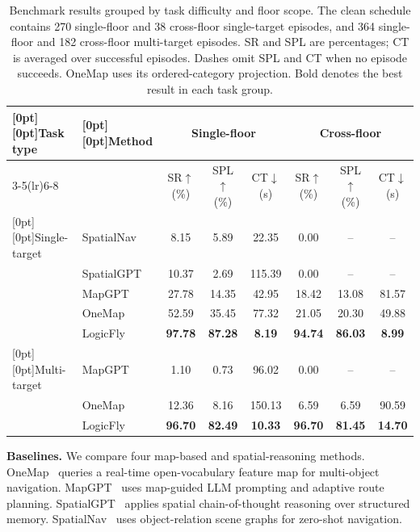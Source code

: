 \documentclass[letterpaper,10pt,journal]{IEEEtran}
\begin{document}
\begin{table}[!t]
\caption{Benchmark results grouped by task difficulty and floor scope. The clean schedule contains 270 single-floor and 38 cross-floor single-target episodes, and 364 single-floor and 182 cross-floor multi-target episodes. SR and SPL are percentages; CT is averaged over successful episodes. Dashes omit SPL and CT when no episode succeeds. OneMap uses its ordered-category projection. Bold denotes the best result in each task group.}
\label{tab:main}\centering\small\renewcommand{\arraystretch}{1.15}
\begin{tabular*}{0.94\textwidth}{@{\extracolsep{\fill}}llcccccc@{}}\toprule
\raisebox{-8pt}[0pt][0pt]{Task type}&\raisebox{-8pt}[0pt][0pt]{Method}&\multicolumn{3}{c}{Single-floor}&\multicolumn{3}{c}{Cross-floor}\\
\cmidrule(lr){3-5}\cmidrule(lr){6-8}
&&SR$\uparrow$ (\%)&SPL$\uparrow$ (\%)&CT$\downarrow$ (s)&SR$\uparrow$ (\%)&SPL$\uparrow$ (\%)&CT$\downarrow$ (s)\\\midrule
\raisebox{-22.9pt}[0pt][0pt]{Single-target}&SpatialNav&8.15&5.89&22.35&0.00&\multicolumn{1}{c}{--}&\multicolumn{1}{c}{--}\\
&SpatialGPT&10.37&2.69&115.39&0.00&\multicolumn{1}{c}{--}&\multicolumn{1}{c}{--}\\
&MapGPT&27.78&14.35&42.95&18.42&13.08&81.57\\
&OneMap&52.59&35.45&77.32&21.05&20.30&49.88\\
&LogicFly&\textbf{97.78}&\textbf{87.28}&\textbf{8.19}&\textbf{94.74}&\textbf{86.03}&\textbf{8.99}\\\midrule
\raisebox{-11.45pt}[0pt][0pt]{Multi-target}&MapGPT&1.10&0.73&96.02&0.00&\multicolumn{1}{c}{--}&\multicolumn{1}{c}{--}\\
&OneMap&12.36&8.16&150.13&6.59&6.59&90.59\\
&LogicFly&\textbf{96.70}&\textbf{82.49}&\textbf{10.33}&\textbf{96.70}&\textbf{81.45}&\textbf{14.70}\\\bottomrule
\end{tabular*}
\end{table}

\textbf{Baselines.}
We compare four map-based and spatial-reasoning methods. OneMap~\cite{busch2025onemap} queries a real-time open-vocabulary feature map for multi-object navigation. MapGPT~\cite{chen2024mapgpt} uses map-guided LLM prompting and adaptive route planning. SpatialGPT~\cite{jiang2025spatialgpt} applies spatial chain-of-thought reasoning over structured memory. SpatialNav~\cite{zhang2026spatialnav} uses object-relation scene graphs for zero-shot navigation.
\end{document}
